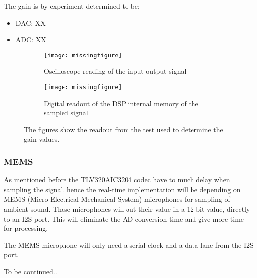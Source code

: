 The gain is by experiment determined to be:
\begin{itemize}
	\item DAC: XX
	\item ADC: XX
\end{itemize}

\begin{figure}[H]
	\centering
	\begin{subfigure}[b]{.45\textwidth}
		\centering
		\texttt{[image: missingfigure]}
		\caption{Oscilloscope reading of the input output signal}
		\label{fig:I2Sconfig}
	\end{subfigure}
	\hfill
	\begin{subfigure}[b]{.45\textwidth}
		\centering
		\texttt{[image: missingfigure]}
		\caption{Digital readout of the DSP internal memory of the sampled signal}
		\label{fig:I2STiming}
	\end{subfigure}	
	\caption{The figures show the readout from the test used to determine the gain values.}
\end{figure}


\subsubsection*{MEMS}


As mentioned before the TLV320AIC3204 codec have to much delay when sampling the signal, hence the real-time implementation will be depending on MEMS (Micro Electrical Mechanical System) microphones for sampling of ambient sound. These microphones will out their value in a 12-bit value, directly to an I2S port. This will eliminate the AD conversion time and give more time for processing.

The MEMS microphone will only need a serial clock and a data lane from the I2S port.

To be continued..
